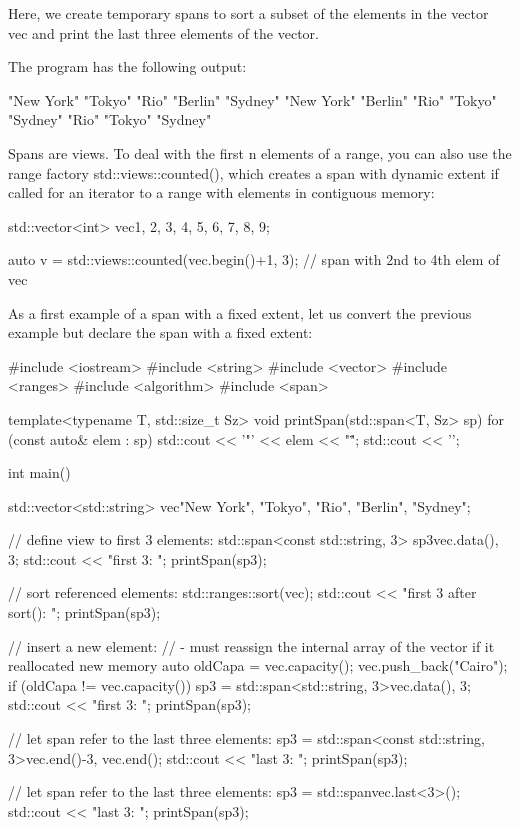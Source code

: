 Here, we create temporary spans to sort a subset of the elements in the vector vec and print the last three elements of the vector.

The program has the following output:

\begin{shell}
"New York" "Tokyo" "Rio" "Berlin" "Sydney"
"New York" "Berlin" "Rio" "Tokyo" "Sydney"
"Rio" "Tokyo" "Sydney"
\end{shell}

Spans are views. To deal with the first n elements of a range, you can also use the range factory std::views::counted(), which creates a span with dynamic extent if called for an iterator to a range with elements in contiguous memory:

\begin{cpp}
std::vector<int> vec{1, 2, 3, 4, 5, 6, 7, 8, 9};

auto v = std::views::counted(vec.begin()+1, 3); // span with 2nd to 4th elem of vec
\end{cpp}


As a first example of a span with a fixed extent, let us convert the previous example but declare the span with a fixed extent:


\begin{cpp}
#include <iostream>
#include <string>
#include <vector>
#include <ranges>
#include <algorithm>
#include <span>

template<typename T, std::size_t Sz>
void printSpan(std::span<T, Sz> sp)
{
	for (const auto& elem : sp) {
		std::cout << '"' << elem << "\" ";
	}
	std::cout << '\n';
}

int main()
{
	std::vector<std::string> vec{"New York", "Tokyo", "Rio", "Berlin", "Sydney"};
	
	// define view to first 3 elements:
	std::span<const std::string, 3> sp3{vec.data(), 3};
	std::cout << "first 3: ";
	printSpan(sp3);
	
	// sort referenced elements:
	std::ranges::sort(vec);
	std::cout << "first 3 after sort(): ";
	printSpan(sp3);
	
	// insert a new element:
	// - must reassign the internal array of the vector if it reallocated new memory
	auto oldCapa = vec.capacity();
	vec.push_back("Cairo");
	if (oldCapa != vec.capacity()) {
		sp3 = std::span<std::string, 3>{vec.data(), 3};
	}
	std::cout << "first 3: ";
	printSpan(sp3);
	
	// let span refer to the last three elements:
	sp3 = std::span<const std::string, 3>{vec.end()-3, vec.end()};
	std::cout << "last 3: ";
	printSpan(sp3);
	
	// let span refer to the last three elements:
	sp3 = std::span{vec}.last<3>();
	std::cout << "last 3: ";
	printSpan(sp3);
}
\end{cpp}

